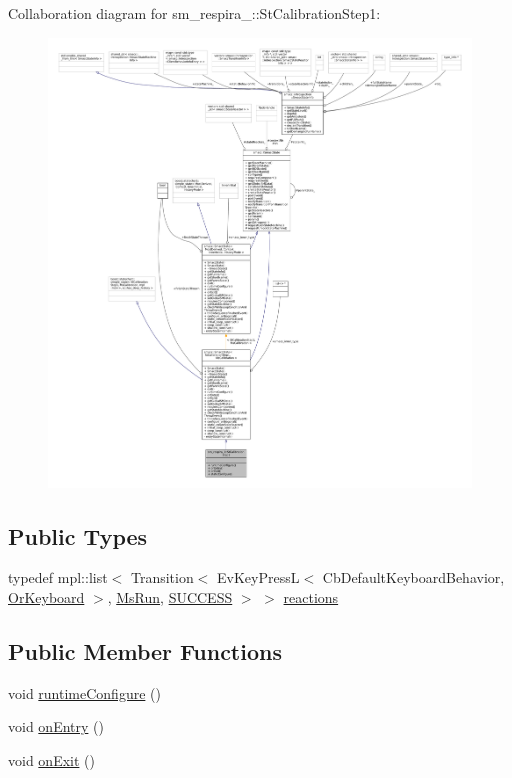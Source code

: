 Collaboration diagram for sm\+\_\+respira\+\_\+:\+:St\+Calibration\+Step1\+:
\nopagebreak
\begin{figure}[H]
\begin{center}
\leavevmode
\includegraphics[width=350pt]{structsm__respira__1_1_1StCalibrationStep1__coll__graph}
\end{center}
\end{figure}
\subsection*{Public Types}
\begin{DoxyCompactItemize}
\item 
typedef mpl\+::list$<$ Transition$<$ Ev\+Key\+PressL$<$ Cb\+Default\+Keyboard\+Behavior, \hyperlink{classsm__respira__1_1_1OrKeyboard}{Or\+Keyboard} $>$, \hyperlink{classsm__respira__1_1_1MsRun}{Ms\+Run}, \hyperlink{classSUCCESS}{S\+U\+C\+C\+E\+SS} $>$ $>$ \hyperlink{structsm__respira__1_1_1StCalibrationStep1_ade778f0068577bb0ac7ad180e665983a}{reactions}
\end{DoxyCompactItemize}
\subsection*{Public Member Functions}
\begin{DoxyCompactItemize}
\item 
void \hyperlink{structsm__respira__1_1_1StCalibrationStep1_a041c623fb452bde3f3abd51eb5d9a7e6}{runtime\+Configure} ()
\item 
void \hyperlink{structsm__respira__1_1_1StCalibrationStep1_ab5935eecf1ce4037e27816db8df8e224}{on\+Entry} ()
\item 
void \hyperlink{structsm__respira__1_1_1StCalibrationStep1_a8b1c4ef9870ba819fa32794ff7a52ef2}{on\+Exit} ()
\end{DoxyCompactItemize}
